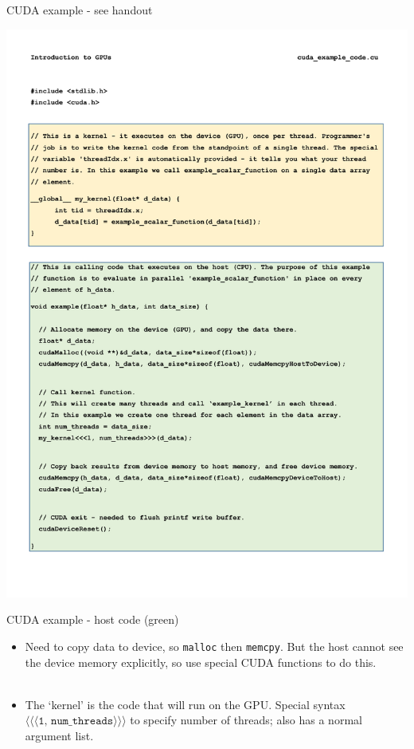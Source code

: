 \documentclass[usenames,dvipsnames]{beamer}
\begin{document}
\begin{frame}{CUDA example - see handout}
  \begin{block}{}
    \begin{center}
      \includegraphics[scale=0.23]{cuda_example_code.pdf}
    \end{center}
  \end{block}
\end{frame}

\begin{frame}{CUDA example - host code (green)}
  \begin{block}{}
    \begin{itemize}
      \item{Need to copy data to device, so \texttt{malloc} then \texttt{memcpy}. But the host cannot see the device memory explicitly, so use special CUDA functions to do this.}\\~\
      \item{The `kernel' is the code that will run on the GPU. Special syntax $\langle\langle\langle \texttt{1, num\_threads} \rangle\rangle\rangle$ to specify number of threads; also has a normal argument list.}\\~\
    \end{itemize}
  \end{block}
\end{frame}
\end{document}
